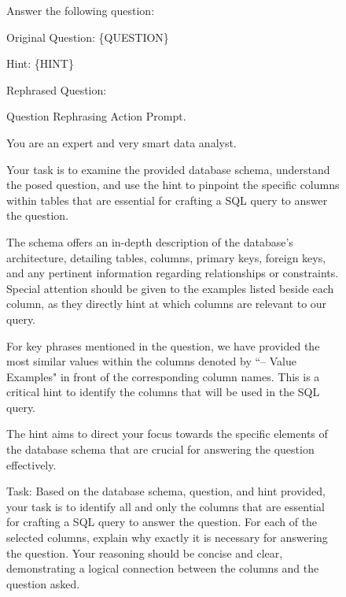 \begin{figure}[h!]
\begin{tcolorbox}
Answer the following question:

Original Question: \{QUESTION\}

Hint: \{HINT\}

Rephrased Question:
    
    \end{tcolorbox}
    \caption{Question Rephrasing Action Prompt.}
    \label{fig:prompt-rephrase-question}
\end{figure}

\newpage

\begin{figure}[t!]
    \centering
    \begin{tcolorbox}[
        title=Schema Selection Action Prompt,
        colback=white,        %
        colframe=blue!75!black,  %
        fonttitle=\bfseries,    %
    ]

You are an expert and very smart data analyst.
\vspace{1em}

Your task is to examine the provided database schema, understand the posed question, and use the hint to pinpoint the specific columns within tables that are essential for crafting a SQL query to answer the question.
\vspace{1em}

The schema offers an in-depth description of the database's architecture, detailing tables, columns, primary keys, foreign keys, and any pertinent information regarding relationships or constraints. Special attention should be given to the examples listed beside each column, as they directly hint at which columns are relevant to our query.
\vspace{1em}

For key phrases mentioned in the question, we have provided the most similar values within the columns denoted by ``-- Value Examples" in front of the corresponding column names. This is a critical hint to identify the columns that will be used in the SQL query.
\vspace{1em}

The hint aims to direct your focus towards the specific elements of the database schema that are crucial for answering the question effectively.
\vspace{1em}

Task:
Based on the database schema, question, and hint provided, your task is to identify all and only the columns that are essential for crafting a SQL query to answer the question.
For each of the selected columns, explain why exactly it is necessary for answering the question. Your reasoning should be concise and clear, demonstrating a logical connection between the columns and the question asked.
\vspace{1em}


\end{tcolorbox}
\end{figure}
